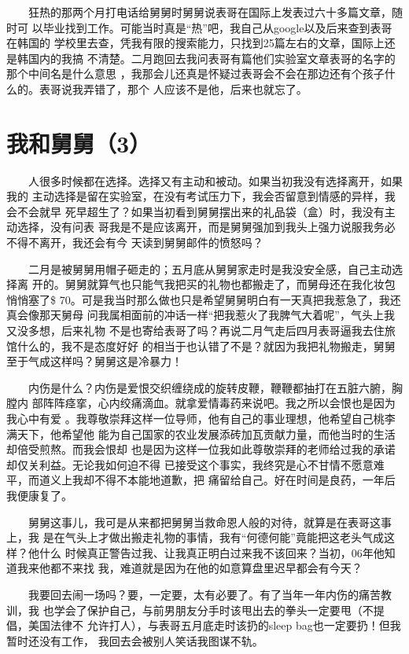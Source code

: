 \documentclass[12pt]{book}
\begin{document}
　　狂热的那两个月打电话给舅舅时舅舅说表哥在国际上发表过六十多篇文章，随时可
以毕业找到工作。可能当时真是“热”吧，我自己从google以及后来查到表哥在韩国的
学校里去查，凭我有限的搜索能力，只找到25篇左右的文章，国际上还是韩国内的我搞
不清楚。二月跑回去我问表哥有篇他们实验室文章表哥的名字的那个中间名是什么意思
，我那会儿还真是怀疑过表哥会不会在那边还有个孩子什么的。表哥说我弄错了，那个
人应该不是他，后来也就忘了。
\section{我和舅舅（3）}
\label{sec-8-29}

　　人很多时候都在选择。选择又有主动和被动。如果当初我没有选择离开，如果我的
主动选择是留在实验室，在没有考试压力下，我会否留意到情感的异样，我会不会就早
死早超生了？如果当初看到舅舅摆出来的礼品袋（盒）时，我没有主动选择，没有问表
哥我是不是应该离开，而是舅舅强加到我头上强力说服我务必不得不离开，我还会有今
天读到舅舅邮件的愤怒吗？

　　二月是被舅舅用帽子砸走的；五月底从舅舅家走时是我没安全感，自己主动选择离
开的。舅舅就算气也只能气我把买的礼物也都搬走了，而舅母还在我化妆包悄悄塞了\$
70。可是我当时那么做也只是希望舅舅明白有一天真把我惹急了，我还真会像那天舅母
问我属相面前的冲话一样“把我惹火了我脾气大着呢”，气头上我又没多想，后来礼物
不是也寄给表哥了吗？再说二月气走后四月表哥逼我去住旅馆什么的，我不是态度好好
的相当于也认错了不是？就因为我把礼物搬走，舅舅至于气成这样吗？舅舅这是冷暴力！

　　内伤是什么？内伤是爱恨交织缠绕成的旋转皮鞭，鞭鞭都抽打在五脏六腑，胸膛内
部阵阵痉挛，心内绞痛滴血。就拿爱情毒药来说吧。我之所以会恨也是因为我心中有爱
。我尊敬崇拜这样一位导师，他有自己的事业理想，他希望自己桃李满天下，他希望他
能为自己国家的农业发展添砖加瓦贡献力量，而他当时的生活却倍受煎熬。而我会恨却
也是因为这样一位我如此尊敬崇拜的老师给过我的承诺却仅关利益。无论我如何迫不得
已接受这个事实，我终究是心不甘情不愿意难平，而道义上我却不得不本能地道歉，把
痛留给自己。好在时间是良药，一年后我便康复了。

　　舅舅这事儿，我可是从来都把舅舅当救命恩人般的对待，就算是在表哥这事上，我
是在气头上才做出搬走礼物的事情，我有“何德何能”竟能把这老头气成这样？他什么
时候真正警告过我、让我真正明白过来我不该回来？当初，06年他知道我来他都不来找
我，难道就是因为在他的如意算盘里迟早都会有今天？

　　我要回去闹一场吗？要，一定要，太有必要了。有了当年一年内伤的痛苦教训，我
也学会了保护自己，与前男朋友分手时该甩出去的拳头一定要甩（不提倡，美国法律不
允许打人），与表哥五月底走时该扔的sleep bag也一定要扔！但我暂时还没有工作，
我回去会被别人笑话我图谋不轨。
\end{document}
